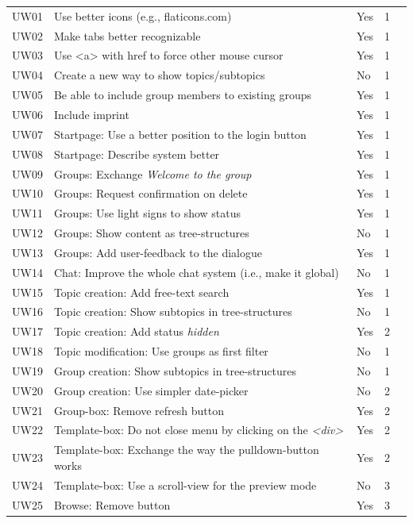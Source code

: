 {\begin{landscape}
\begin{center}
\begin{longtable}{|l|l|lll|}
\hline \hline
\endlastfoot
		\hline
	UW01 & Use better icons (e.g., flaticons.com) & Yes & 1 \\
	UW02 & Make tabs better recognizable & Yes & 1 \\
	UW03 & Use <a> with href to force other mouse cursor & Yes & 1 \\
	UW04 & Create a new way to show topics/subtopics & No & 1 \\
	UW05 & Be able to include group members to existing groups & Yes & 1 \\
	UW06 & Include imprint & Yes & 1 \\
	UW07 & Startpage: Use a better position to the login button & Yes & 1 \\
	UW08 & Startpage: Describe system better & Yes & 1 \\
	UW09 & Groups: Exchange \emph{Welcome to the group}  & Yes & 1 \\
	UW10 & Groups: Request confirmation on delete & Yes & 1 \\
	UW11 & Groups: Use light signs to show status & Yes & 1 \\
	UW12 & Groups: Show content as tree-structures & No & 1 \\
	UW13 & Groups: Add user-feedback to the dialogue & Yes & 1 \\
	UW14 & Chat: Improve the whole chat system (i.e., make it global) & No & 1 \\
	UW15 & Topic creation: Add free-text search  & Yes & 1 \\
	UW16 & Topic creation: Show subtopics in tree-structures  & No & 1 \\
	UW17 & Topic creation: Add status \emph{hidden}  & Yes & 2 \\
	UW18 & Topic modification: Use groups as first filter  & No & 1 \\
	UW19 & Group creation: Show subtopics in tree-structures  & No & 1 \\
	UW20 & Group creation: Use simpler date-picker  & No & 2 \\
	UW21 & Group-box: Remove refresh button  & Yes & 2 \\
	UW22 & Template-box: Do not close menu by clicking on the \emph{<div>}  & Yes & 2 \\
	UW23 & Template-box: Exchange the way the pulldown-button works  & Yes & 2 \\
	UW24 & Template-box: Use a scroll-view for the preview mode  & No & 3 \\
	UW25 & Browse: Remove button  & Yes & 3 \\

\end{longtable}
\end{center}
\end{landscape}}
